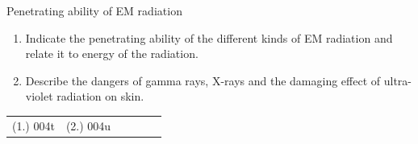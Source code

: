         \label{m38779*uid27}
            \begin{exercises}{Penetrating ability of EM radiation}\noindent\vspace{-1cm}
            
        \label{m38779*id189729}\begin{enumerate}[noitemsep, label=\textbf{\arabic*}. ] 
            \label{m38779*uid28}\item Indicate the penetrating ability of the different kinds of EM radiation and relate it to energy of the radiation.\newline
\label{m38779*uid29}\item Describe the dangers of gamma rays, X-rays and the damaging effect of ultra-violet radiation on skin.\newline
\end{enumerate}
    \label{m38779*cid8}
\practiceinfo
 \par \begin{tabular}[h]{cccccc}
 (1.) 004t  &  (2.) 004u  &  \end{tabular}
\end{exercises}


